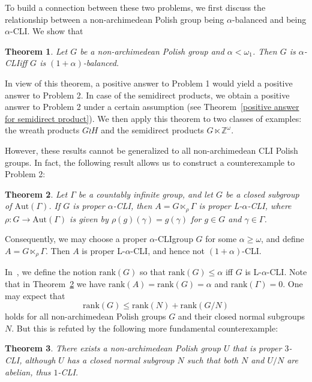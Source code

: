 \documentclass[11pt]{amsart}
\newtheorem{theorem}{Theorem}[section]
\theoremstyle{definition}
\theoremstyle{remark}
\numberwithin{equation}{section}
\def\Z {{\mathbb{Z}}}
\def\rank{{\mathrm{rank}}}
\def\hier#1{$#1$-CLI}
\def\aut{{\mathrm{Aut}}}
\begin{document}
To build a connection between these two problems, we first discuss the relationship between a non-archimedean Polish group being $\alpha$-balanced and being \hier\alpha. We show that

\begin{theorem}
    Let $G$ be a non-archimedean Polish group and $\alpha<\omega_1$. Then $G$ is \hier\alpha\space iff $G$ is $(1+\alpha)$-balanced.
\end{theorem}

In view of this theorem, a positive answer to Problem 1 would yield a positive answer to Problem 2. In case of the semidirect products, we obtain a positive answer to Problem 2 under a certain assumption (see Theorem~\ref{positive answer for semidirect product}). We then apply this theorem to two classes of examples: the wreath products $G\wr H$ and the semidirect products $G\ltimes\Z^\omega$.

However, these results cannot be generalized to all non-archimedean CLI Polish groups. In fact, the following result allows us to construct a counterexample to Problem 2:

\begin{theorem}\label{introduction counterexample 1}
    Let $\Gamma$ be a countably infinite group, and let $G$ be a closed subgroup of $\aut(\Gamma)$. If $G$ is proper \hier\alpha, then $A=G\ltimes_\rho\Gamma$ is proper L-\hier\alpha, where $\rho:G\to\aut(\Gamma)$ is given by
    $\rho(g)(\gamma)=g(\gamma)$ for $g\in G$ and $\gamma\in\Gamma$.
\end{theorem}

Consequently, we may choose a proper \hier\alpha\space group $G$ for some $\alpha\geq\omega$, and define $A=G\ltimes_\rho\Gamma$. Then $A$ is proper L-\hier\alpha, and hence not \hier{(1+\alpha)}.

In~\cite{DingW}, we define the notion $\rank(G)$ so that $\rank(G)\le\alpha$ iff $G$ is L-\hier\alpha\space. Note that in Theorem~\ref{introduction counterexample 1} we have $\rank(A)=\rank(G)=\alpha$ and $\rank(\Gamma)=0$. One may expect that
$$\rank(G)\leq\rank(N)+\rank(G/N)$$
holds for all non-archimedean Polish groups $G$ and their closed normal subgroups $N$. But this is refuted by the following more fundamental counterexample:


\begin{theorem}\label{rank counterexample}
    There exists a non-archimedean Polish group $U$ that is proper \hier3, although $U$ has a closed normal subgroup $N$ such that both $N$ and $U/N$ are abelian, thus \hier1.
\end{theorem}
\end{document}
